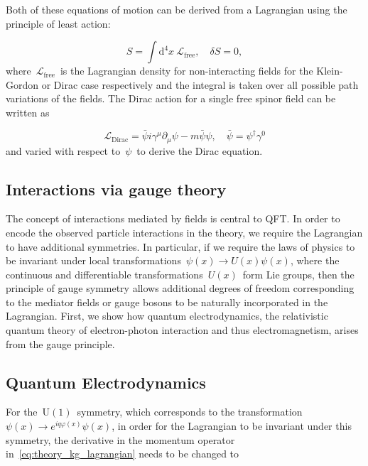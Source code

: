 Both of these equations of motion can be derived from a Lagrangian using the principle of least action:

\begin{equation}
\label{eq:theory_action}
S = \int \mathrm{d}^4x\ \mathcal{L}_{\mathrm{free}},\quad \delta S = 0,
\end{equation}
where~$\mathcal{L}_{\mathrm{free}}$~is the Lagrangian density for non-interacting fields for the Klein-Gordon or Dirac case respectively and the integral is taken over all possible path variations of the fields. The Dirac action for a single free spinor field can be written as

\begin{equation}
\label{eq:theory_kg_lagrangian}
\mathcal{L}_{\mathrm{Dirac}} = \bar{\psi} i \gamma^\mu \partial_\mu \psi - m \bar{\psi} \psi,\quad \bar{\psi} = \psi^\dagger \gamma^0
\end{equation}
and varied with respect to~$\psi$~to derive the Dirac equation.

\subsection{Interactions via gauge theory}
The concept of interactions mediated by fields is central to QFT. In order to encode the observed particle interactions in the theory, we require the Lagrangian to have additional symmetries. In particular, if we require the laws of physics to be invariant under local transformations~$\psi(x) \rightarrow U(x) \psi(x)$, where the continuous and differentiable transformations~$U(x)$~form Lie groups, then the principle of gauge symmetry allows additional degrees of freedom corresponding to the mediator fields or gauge bosons to be naturally incorporated in the Lagrangian. First, we show how quantum electrodynamics, the relativistic quantum theory of electron-photon interaction and thus electromagnetism, arises from the gauge principle.

\subsection{Quantum Electrodynamics}
For the~$\mathrm{U}(1)$~symmetry, which corresponds to the transformation~$\psi(x) \rightarrow e^{i q\varphi(x)} \psi(x)$, in order for the Lagrangian to be invariant under this symmetry, the derivative in the momentum operator in~\cref{eq:theory_kg_lagrangian} needs to be changed to

